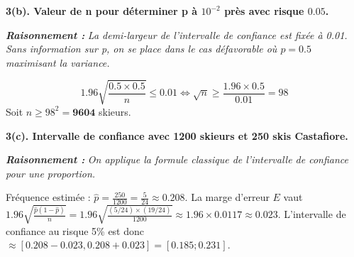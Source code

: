 \documentclass[11pt,a4paper]{article}
\newcommand{\raisonnement}[1]{
    \vspace{0.2cm}
    \noindent\textcolor{blue!80!black}{
        \textbf{\textit{Raisonnement : }} \textit{#1}
    }
    \vspace{0.2cm}
}
\begin{document}
\textbf{3(b). Valeur de n pour déterminer p à $10^{-2}$ près avec risque $0.05$.}
\raisonnement{La demi-largeur de l'intervalle de confiance est fixée à 0.01. Sans information sur p, on se place dans le cas défavorable où $p=0.5$ maximisant la variance.}
$$ 1.96 \sqrt{\frac{0.5 \times 0.5}{n}} \le 0.01 \iff \sqrt{n} \ge \frac{1.96 \times 0.5}{0.01} = 98 $$
Soit $n \ge 98^2 = \mathbf{9604}$ skieurs.

\textbf{3(c). Intervalle de confiance avec 1200 skieurs et 250 skis Castafiore.}
\raisonnement{On applique la formule classique de l'intervalle de confiance pour une proportion.}
Fréquence estimée : $\hat{p} = \frac{250}{1200} = \frac{5}{24} \approx 0.208$.
La marge d'erreur $E$ vaut $1.96 \sqrt{\frac{\hat{p}(1-\hat{p})}{n}} = 1.96 \sqrt{\frac{(5/24) \times (19/24)}{1200}} \approx 1.96 \times 0.0117 \approx 0.023$.
L'intervalle de confiance au risque 5\% est donc $\approx [0.208 - 0.023, 0.208 + 0.023] = \mathbf{[0.185 ; 0.231]}$.
\end{document}
